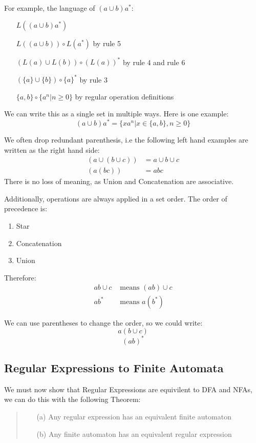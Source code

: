 \documentclass[11pt]{article}
\begin{document}
For example, the language of $(a \cup b) a^\ast$:
\begin{itemize}
	\item[] $L((a \cup b) a^\ast)$
	\item[] $L((a \cup b)) \circ L(a^\ast)$ by rule 5
	\item[] $(L(a) \cup L(b)) \circ (L(a))^\ast$ by rule 4 and rule 6
	\item[] $(\{a\} \cup \{b\}) \circ \{a\}^\ast$ by rule 3
	\item[] $\{a, b\} \circ \{a^n | n \geq 0\}$ by regular operation definitions
\end{itemize}

We can write this as a single set in multiple ways. Here is one example:
$$(a \cup b) a^\ast = \{xa^n|x\in\{a,b\},n\geq0\}$$

We often drop redundant parenthesis, i.e the following left hand examples are
written as the right hand side:
\begin{align*}
	(a \cup (b \cup c)) & = a \cup b \cup c \\
	(a(bc))             & = abc
\end{align*}
There is no loss of meaning, as Union and Concatenation are associative.

Additionally, operations are always applied in a set order. The order of
precedence is:
\begin{enumerate}
	\item Star
	\item Concatenation
	\item Union
\end{enumerate}
Therefore:
\begin{align*}
	ab \cup c & \text{ means } (ab) \cup c \\
	ab^\ast   & \text{ means } a(b^\ast)
\end{align*}

We can use parentheses to change the order, so we could write:
$$a ( b \cup c)$$
$$(ab)^\ast$$


\subsection{Regular Expressions to Finite Automata}
We must now show that Regular Expressions are equivilent to DFA and NFAs, we can
do this with the following Theorem:
\begin{quote}
	\begin{itemize}
		\item[(a)] Any regular expression has an equivalent finite automaton
		\item[(b)] Any finite automaton has an equivalent regular expression
	\end{itemize}
\end{quote}
\end{document}
